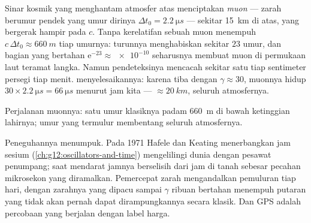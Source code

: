 \begin{example}\label{ex:g12:special-relativity:muons}
Sinar kosmik yang menghantam atmosfer atas menciptakan \emph{muon} ---
zarah berumur pendek yang umur dirinya $\Delta t_0 = \qty{2.2}{\micro s}$
--- sekitar \qty{15}{km} di atas, yang bergerak hampir pada $c$. Tanpa kerelatifan sebuah muon
menempuh $c\,\Delta t_0 \approx \qty{660}{m}$ tiap umurnya: turunnya menghabiskan
sekitar $23$ umur, dan bagian yang bertahan
$\mathrm{e}^{-23} \approx \num{e-10}$ seharusnya membuat muon di permukaan laut
teramat langka. Namun pendeteksinya mencacah sekitar satu tiap sentimeter persegi tiap
menit.  menyelesaikannya: karena tiba dengan $\gamma \approx 30$, muonnya
hidup $30 \times \qty{2.2}{\micro s} = \qty{66}{\micro s}$ menurut jam
kita ---  $\approx \qty{20}{km}$, seluruh atmosfernya.
\end{example}

\begin{omfigure}

{\small Perjalanan muonnya: satu umur klasiknya padam \qty{660}{m}
di bawah ketinggian lahirnya; umur yang termulur membentang seluruh atmosfernya.}
\end{omfigure}

Peneguhannya menumpuk. Pada 1971 Hafele dan Keating menerbangkan jam 
sesium (\cref{ch:g12:oscillators-and-time}) mengelilingi dunia dengan pesawat penumpang;
saat mendarat jamnya berselisih dari jam di tanah sebesar pecahan mikrosekon yang
diramalkan. Pemercepat zarah mengandalkan pemuluran tiap hari, dengan zarahnya yang
dipacu sampai $\gamma$ ribuan bertahan menempuh putaran yang tidak akan pernah dapat
dirampungkannya secara klasik. Dan GPS adalah percobaan yang berjalan dengan label harga.

